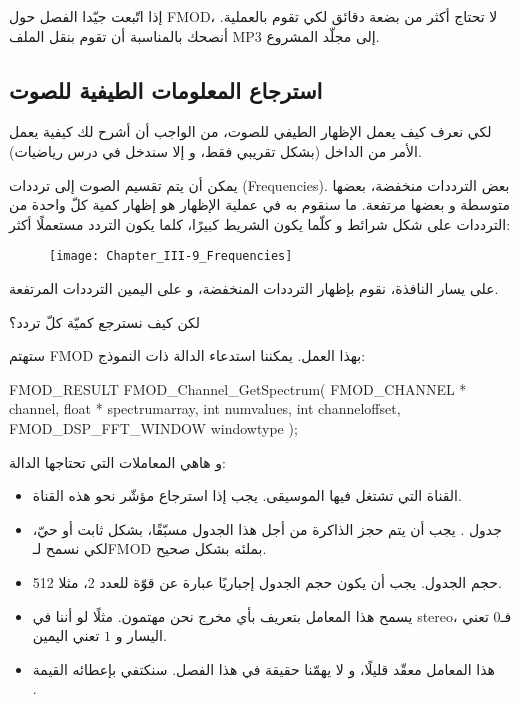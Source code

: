 إذا اتّبعت جيّدا الفصل حول
\textenglish{FMOD}،
لا تحتاج أكثر من بضعة دقائق لكي تقوم بالعملية. أنصحك بالمناسبة أن تقوم بنقل الملف
\textenglish{MP3}
إلى مجلّد المشروع.

\subsection{استرجاع المعلومات الطيفية للصوت}

لكي نعرف كيف يعمل الإظهار الطيفي للصوت، من الواجب أن أشرح لك كيفية يعمل الأمر من الداخل (بشكل تقريبي فقط، و إلا سندخل في درس رياضيات).

يمكن أن يتم تقسيم الصوت إلى ترددات 
(\textenglish{Frequencies}).
بعض الترددات منخفضة، بعضها متوسطة و بعضها مرتفعة. ما سنقوم به في عملية الإظهار هو إظهار كمية كلّ واحدة من الترددات على شكل شرائط و كلّما يكون الشريط كبيرًا، كلما يكون التردد مستعملًا أكثر:

\begin{figure}[H]
	\centering
	\texttt{[image: Chapter\_III-9\_Frequencies]}
\end{figure}

على يسار النافذة، نقوم بإظهار الترددات المنخفضة، و على اليمين الترددات المرتفعة.

\begin{question}
لكن كيف نسترجع كميّة كلّ تردد؟
\end{question}

ستهتم
\textenglish{FMOD}
بهذا العمل. يمكننا استدعاء الدالة
ذات النموذج:

\begin{Csource}
FMOD_RESULT FMOD_Channel_GetSpectrum(
	FMOD_CHANNEL *  channel,
	float *  spectrumarray,
	int  numvalues,
	int  channeloffset,
	FMOD_DSP_FFT_WINDOW  windowtype
);
\end{Csource}

و هاهي المعاملات التي تحتاجها الدالة:

\begin{itemize}
	\item القناة التي تشتغل فيها الموسيقى. يجب إذا استرجاع مؤشّر نحو هذه القناة.
	\item جدول
	.
	يجب أن يتم حجز الذاكرة من أجل هذا الجدول مسبّقًا، بشكل ثابت أو حيّ، لكي نسمح لـ\textenglish{FMOD}
	بملئه بشكل صحيح.
	\item حجم الجدول. يجب أن يكون حجم الجدول إجباريًا عبارة عن قوّة للعدد 2، مثلا 512.
	\item يسمح هذا المعامل بتعريف بأي مخرج نحن مهتمون. مثلًا لو أننا في
	\textenglish{stereo}،
	فـ$ 0 $ تعني اليسار و $ 1 $ تعني اليمين.
	\item هذا المعامل معقّد قليلًا، و لا يهمّنا حقيقة في هذا الفصل. سنكتفي بإعطائه القيمة\\ 
	.
\end{itemize}

